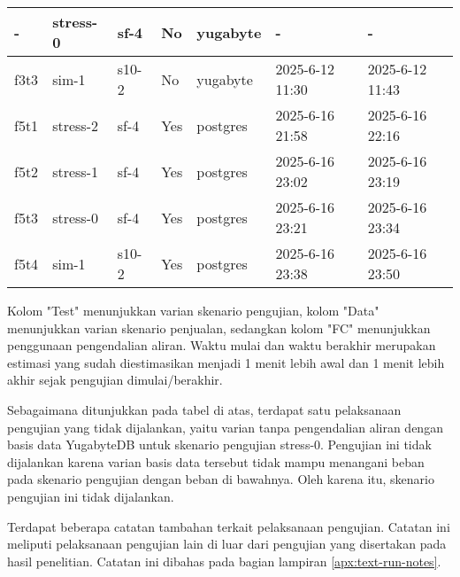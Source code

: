 \begin{table}[htbp]
\begin{tabular}{|l|l|l|l|l|l|l|}
        -           & stress-0      & sf-4          & No          & yugabyte          & -                    & -                       \\ \hline
        f3t3        & sim-1         & s10-2         & No          & yugabyte          & 2025-6-12 11:30     & 2025-6-12 11:43        \\ \hline
        f5t1        & stress-2      & sf-4          & Yes         & postgres          & 2025-6-16 21:58     & 2025-6-16 22:16        \\ \hline
        f5t2        & stress-1      & sf-4          & Yes         & postgres          & 2025-6-16 23:02     & 2025-6-16 23:19        \\ \hline
        f5t3        & stress-0      & sf-4          & Yes         & postgres          & 2025-6-16 23:21     & 2025-6-16 23:34        \\ \hline
        f5t4        & sim-1         & s10-2         & Yes         & postgres          & 2025-6-16 23:38     & 2025-6-16 23:50        \\ \hline
    \end{tabular}
\end{table}

Kolom "Test" menunjukkan varian skenario pengujian, kolom "Data" menunjukkan varian skenario penjualan, sedangkan kolom "FC" menunjukkan penggunaan pengendalian aliran. Waktu mulai dan waktu berakhir merupakan estimasi yang sudah diestimasikan menjadi 1 menit lebih awal dan 1 menit lebih akhir sejak pengujian dimulai/berakhir.

Sebagaimana ditunjukkan pada tabel di atas, terdapat satu pelaksanaan pengujian yang tidak dijalankan, yaitu varian tanpa pengendalian aliran dengan basis data YugabyteDB untuk skenario pengujian stress-0. Pengujian ini tidak dijalankan karena varian basis data tersebut tidak mampu menangani beban pada skenario pengujian dengan beban di bawahnya. Oleh karena itu, skenario pengujian ini tidak dijalankan.

Terdapat beberapa catatan tambahan terkait pelaksanaan pengujian. Catatan ini meliputi pelaksanaan pengujian lain di luar dari pengujian yang disertakan pada hasil penelitian. Catatan ini dibahas pada bagian lampiran \ref{apx:text-run-notes}.
